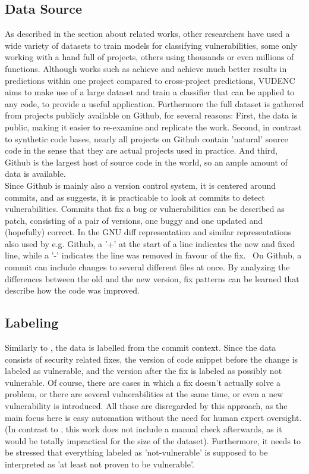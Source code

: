 \documentclass[
	a4paper,
	pagesize,
	pdftex,
	12pt,
	twoside, %
	BCOR=5mm, %
	ngerman,
	fleqn,
	final,
	]{scrartcl}
\begin{document}
\subsection{Data Source}\label{diff}
As described in the section about related works, other researchers have used a wide variety of datasets to train models for classifying vulnerabilities, some only working with a hand full of projects, others using thousands or even millions of functions. Although works such as \cite{Dam.2017} achieve and \cite{Pang.2015} achieve much better results in predictions within one project compared to cross-project predictions, VUDENC aims to make use of a large dataset and train a classifier that can be applied to any code, to provide a useful application. Furthermore the full dataset is gathered from projects publicly available on Github, for several reasons: First, the data is public, making it easier to re-examine and replicate the work. Second, in contrast to synthetic code bases, nearly all projects on Github contain 'natural' source code in the sense that they are actual projects used in practice. And third, Github is the largest host of source code in the world, so an ample amount of data is available.\\
Since Github is mainly also a version control system, it is centered around commits, and as \cite{Zhou.2017} suggests, it is practicable to look at commits to detect vulnerabilities. Commits that fix a bug or vulnerabilities can be described as patch, consisting of a pair of versions, one buggy and one updated and (hopefully) correct. In the GNU diff representation and similar representations also used by e.g. Github, a '+' at the start of a line indicates the new and fixed line, while a '-' indicates the line was removed in favour of the fix.~\cite{Liu.2018} On Github, a commit can include changes to several different files at once. By analyzing the differences between the old and the new version, fix patterns can be learned that describe how the code was improved. \\

\subsection{Labeling}
Similarly to \cite{Li.2018}, the data is labelled from the commit context. Since the data consists of security related fixes, the version of code snippet before the change is labeled as vulnerable, and the version after the fix is labeled as possibly not vulnerable. Of course, there are cases in which a fix doesn't actually solve a problem, or there are several vulnerabilities at the same time, or even a new vulnerability is introduced. All those are disregarded by this approach, as the main focus here is easy automation without the need for human expert oversight. (In contrast to \cite{Li.2018}, this work does not include a manual check afterwards, as it would be totally impractical for the size of the dataset). Furthermore, it needs to be stressed that everything labeled as 'not-vulnerable' is supposed to be interpreted as 'at least not proven to be vulnerable'. 
\end{document}
